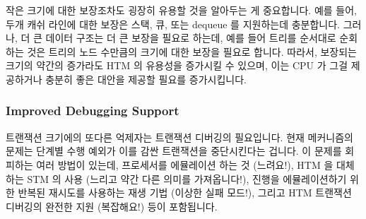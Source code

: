 \iffalse

Forward-progress guarantees are important, but as we saw, they will
be conditional guarantees based on transaction size and duration.
There has been some progress, for example, some commercially available
HTM implementations use approximation techniques to support extremely
large HTM read sets~\cite{RaviRajwar2012TSX}.
For another example, \Power{8} HTM supports suspended transations, which
avoid adding irrelevant accesses to the suspended transation's read and
write sets~\cite{Le:2015:TMS:3266491.3266500}.
This capability has been used to produce a high performance
reader-writer lock~\cite{PascalFelber2016rwlockElision}.

\fi

작은 크기에 대한 보장조차도 굉장히 유용할 것을 알아두는 게 중요합니다.
예를 들어, 두개 캐쉬 라인에 대한 보장은 스택, 큐, 또는 dequeue 를 지원하는데
충분합니다.
그러나, 더 큰 데이터 구조는 더 큰 보장을 필요로 하는데, 예를 들어 트리를
순서대로 순회하는 것은 트리의 노드 수만큼의 크기에 대한 보장을 필요로 합니다.
따라서, 보장되는 크기의 약간의 증가라도 HTM 의 유용성을 증가시킬 수 있으며,
이는 CPU 가 그걸 제공하거나 충분히 좋은 대안을 제공할 필요를 증가시킵니다.

\iffalse

It is important to note that even small-sized guarantees will be
quite useful.
For example,
a guarantee of two cache lines is sufficient for a stack, queue, or dequeue.
However, larger data structures require larger guarantees, for example,
traversing a tree in order requires a guarantee equal to the number
of nodes in the tree.
Therefore, even modest increases in the size of the guarantee also
increases the usefulness of HTM, thereby increasing the need for CPUs
to either provide it or provide good-and-sufficient workarounds.

\fi

\subsubsection{Improved Debugging Support}
\label{sec:future:Improved Debugging Support}

트랜잭션 크기에의 또다른 억제자는 트랜잭션 디버깅의 필요입니다.
현재 메커니즘의 문제는 단계별 수행 예외가 이를 감싼 트랜잭션을 중단시킨다는
겁니다.
이 문제를 회피하는 여러 방법이 있는데, 프로세서를 에뮬레이션 하는 것 (느려요!),
HTM 을 대체하는 STM 의 사용 (느리고 약간 다른 의미를 가져옵니다!), 진행을
에뮬레이션하기 위한 반복된 재시도를 사용하는 재생 기법 (이상한 실패 모드!),
그리고 HTM 트랜잭션 디버깅의 완전한 지원 (복잡해요!) 등이 포함됩니다.

